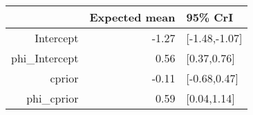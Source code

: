\begin{tabular}{rrl}
  \hline
 & Expected mean & 95\% CrI \\ 
  \hline
Intercept & -1.27 & [-1.48,-1.07] \\ 
  phi\_Intercept & 0.56 & [0.37,0.76] \\ 
  cprior & -0.11 & [-0.68,0.47] \\ 
  phi\_cprior & 0.59 & [0.04,1.14] \\ 
   \hline
\end{tabular}

